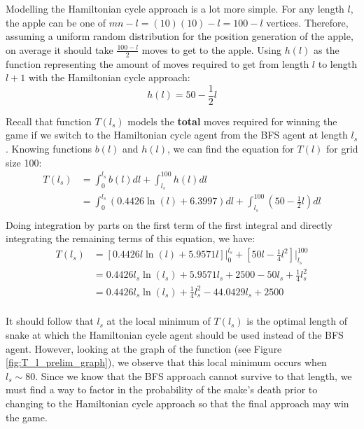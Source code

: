 \documentclass[12pt]{article}
\begin{document}
Modelling the Hamiltonian cycle approach is a lot more simple. For any length $l$, the apple can be one of $mn-l=(10)(10)-l=100-l$ vertices. Therefore, assuming a uniform random distribution for the position generation of the apple, on average it should take $\frac{100-l}{2}$ moves to get to the apple. Using $h(l)$ as the function representing the amount of moves required to get from length $l$ to length $l+1$ with the Hamiltonian cycle approach:
\begin{equation}
h(l) = 50-\frac{1}{2}l
\end{equation}

Recall that function $T(l_{s})$ models the \textbf{total} moves required for winning the game if we switch to the Hamiltonian cycle agent from the BFS agent at length $l_{s}$. Knowing functions $b(l)$ and $h(l)$, we can find the equation for $T(l)$ for grid size 100:
\begin{equation}
\begin{split}
T(l_{s}) & = \int_{0}^{l_{s}} b(l)dl + \int_{l_{s}}^{100} h(l)dl \\
& = \int_{0}^{l_{s}} (0.4426\ln(l) + 6.3997) dl + \int_{l_{s}}^{100} (50-\frac{1}{2}l)dl\\
\end{split}
\end{equation}
Doing integration by parts on the first term of the first integral and directly integrating the remaining terms of this equation, we have:
\begin{equation}
\begin{split}
T(l_{s}) & = [0.4426l\ln(l) + 5.9571l] \Big|_{0}^{l_{s}} + [50l-\frac{1}{4}l^2] \Big|_{l_{s}}^{100} \\
& = 0.4426l_{s}\ln(l_{s}) + 5.9571l_{s} + 2500 - 50l_{s}+\frac{1}{4}l_{s}^2 \\
& = 0.4426l_{s}\ln(l_{s}) + \frac{1}{4}l_{s}^2 - 44.0429l_{s} + 2500 \\
\end{split}
\end{equation}

It should follow that $l_s$ at the local minimum of $T(l_s)$ is the optimal length of snake at which the Hamiltonian cycle agent should be used instead of the BFS agent. However, looking at the graph of the function (see Figure \ref{fig:T_l_prelim_graph}), we observe that this local minimum occurs when $l_s \sim 80$. Since we know that the BFS approach cannot survive to that length, we must find a way to factor in the probability of the snake's death prior to changing to the Hamiltonian cycle approach so that the final approach may win the game.
\end{document}

